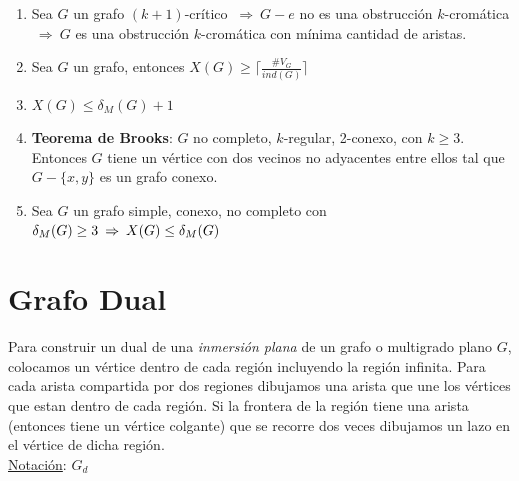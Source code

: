 \documentclass{article}
\newcommand{\Rightarrows}{\: \Rightarrow \:}            %
\newcommand{\bld}[1]{\textbf{#1}}
\begin{document}
\begin{enumerate}
    \item Sea $G$ un grafo $(k+1)$-crítico $\Rightarrows G-e$ no es una obstrucción $k$-cromática $\Rightarrows G$ es una obstrucción $k$-cromática con mínima cantidad de aristas.
    \item Sea $G$ un grafo, entonces $X(G) \geq \lceil \frac{\#V_G}{ind(G)} \rceil$
    \item $X(G) \leq \delta_M(G) + 1$
    \item \bld{Teorema de Brooks}: $G$ no completo, $k$-regular, 2-conexo, con $k \geq 3$. Entonces
    $G$ tiene un vértice con dos vecinos no adyacentes entre ellos tal que $G - \{x,y\}$ es un grafo conexo.
    \item Sea $G$ un grafo simple, conexo, no completo con $\delta_M(G) \geq 3 \\\Rightarrows X(G) \leq \delta_M(G)$
\end{enumerate}

\newpage
\section{Grafo Dual}
Para construir un dual de una \emph{inmersión plana} de un grafo o multigrado plano $G$, colocamos un vértice 
dentro de cada región incluyendo la región infinita. Para cada arista compartida por dos regiones dibujamos una arista que une
los vértices que estan dentro de cada región. Si la frontera de la región tiene una
arista (entonces tiene un vértice colgante) que se recorre dos veces dibujamos un lazo en el vértice de dicha región.
\\\underline{Notación}: $G_d$
\end{document}

